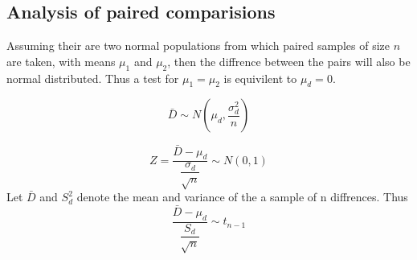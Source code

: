     \newpage
    \subsection{Analysis of paired comparisions}
        Assuming their are two normal populations from which paired samples of size $n$ are taken, with means $\mu_1$ and $\mu_2$, then the diffrence between the pairs will also be normal distributed. Thus a test for $\mu_1 = \mu_2$ is equivilent to $\mu_d = 0$.

        $$
        \bar{D} \sim N\left(\mu_d, \frac{\sigma_d^2}{n}\right)
        $$

        $$
        Z = \dfrac{\bar{D} - \mu_d}{\dfrac{\sigma_d}{\sqrt{n}}} \sim N(0, 1)
        $$
        Let $\bar{D}$ and $S_d^2$ denote the mean and variance of the a sample of n diffrences. Thus
        $$
        \frac{\bar{D} - \mu_d}{\dfrac{S_d}{\sqrt{n}}} \sim t_{n-1}
        $$

